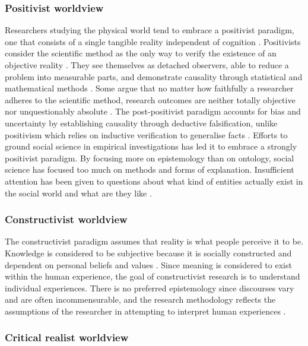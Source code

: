 \subsubsection{Positivist worldview}

Researchers studying the physical world tend to embrace a positivist paradigm, one that consists of a single tangible reality independent of cognition \citep{van2007engaged}. Positivists consider the scientific method as the only way to verify the existence of an objective reality \citep{creswell2011designing}. They see themselves as detached observers, able to reduce a problem into measurable parts, and demonstrate causality through statistical and mathematical methods \citep{easterby2015management}. Some argue that no matter how faithfully a researcher adheres to the scientific method, research outcomes are neither totally objective nor unquestionably absolute \citep[][p. 40]{crotty1998foundations}. The post-positivist paradigm accounts for bias and uncertainty by establishing causality through deductive falsification, unlike positivism which relies on inductive verification to generalise facts \citep{van2007engaged,chilisa2012selecting}. Efforts to ground social science in empirical investigations has led it to embrace a strongly positivist paradigm. By focusing more on epistemology than on ontology, social science has focused too much on methods and forms of explanation. Insufficient attention has been given to questions about what kind of entities actually exist in the social world and what are they like \citep{archer2016what}. 

\subsubsection{Constructivist worldview}

The constructivist paradigm assumes that reality is what people perceive it to be. Knowledge is considered to be subjective because it is socially constructed and dependent on personal beliefs and values \citep{chilisa2012selecting}. Since meaning is considered to exist within the human experience, the goal of constructivist research is to understand individual experiences. There is no preferred epistemology since discourses vary and are often incommensurable, and the research methodology reflects the assumptions of the researcher in attempting to interpret human experiences \citep{van2007engaged}. 

\subsubsection{Critical realist worldview}

